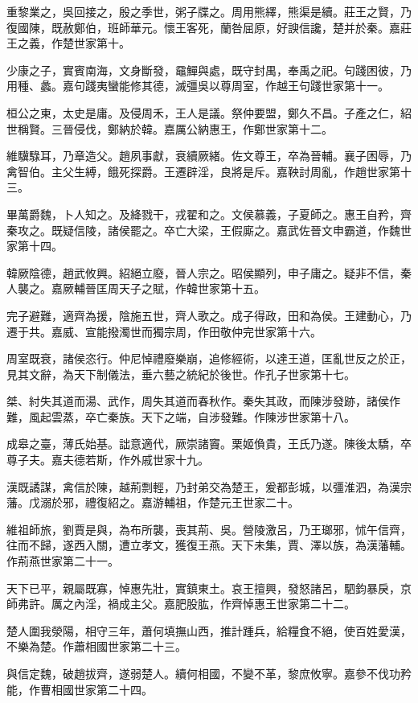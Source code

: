 重黎業之，吳回接之，殷之季世，粥子牒之。周用熊繹，熊渠是續。莊王之賢，乃復國陳，既赦鄭伯，班師華元。懷王客死，蘭咎屈原，好諛信讒，楚并於秦。嘉莊王之義，作楚世家第十。

少康之子，實賓南海，文身斷發，黿鱓與處，既守封禺，奉禹之祀。句踐困彼，乃用種、蠡。嘉句踐夷蠻能修其德，滅彊吳以尊周室，作越王句踐世家第十一。

桓公之東，太史是庸。及侵周禾，王人是議。祭仲要盟，鄭久不昌。子產之仁，紹世稱賢。三晉侵伐，鄭納於韓。嘉厲公納惠王，作鄭世家第十二。

維驥騄耳，乃章造父。趙夙事獻，衰續厥緒。佐文尊王，卒為晉輔。襄子困辱，乃禽智伯。主父生縛，餓死探爵。王遷辟淫，良將是斥。嘉鞅討周亂，作趙世家第十三。

畢萬爵魏，卜人知之。及絳戮干，戎翟和之。文侯慕義，子夏師之。惠王自矜，齊秦攻之。既疑信陵，諸侯罷之。卒亡大梁，王假廝之。嘉武佐晉文申霸道，作魏世家第十四。

韓厥陰德，趙武攸興。紹絕立廢，晉人宗之。昭侯顯列，申子庸之。疑非不信，秦人襲之。嘉厥輔晉匡周天子之賦，作韓世家第十五。

完子避難，適齊為援，陰施五世，齊人歌之。成子得政，田和為侯。王建動心，乃遷于共。嘉威、宣能撥濁世而獨宗周，作田敬仲完世家第十六。

周室既衰，諸侯恣行。仲尼悼禮廢樂崩，追修經術，以達王道，匡亂世反之於正，見其文辭，為天下制儀法，垂六藝之統紀於後世。作孔子世家第十七。

桀、紂失其道而湯、武作，周失其道而春秋作。秦失其政，而陳涉發跡，諸侯作難，風起雲蒸，卒亡秦族。天下之端，自涉發難。作陳涉世家第十八。

成皋之臺，薄氏始基。詘意適代，厥崇諸竇。栗姬偩貴，王氏乃遂。陳後太驕，卒尊子夫。嘉夫德若斯，作外戚世家十九。

漢既譎謀，禽信於陳，越荊剽輕，乃封弟交為楚王，爰都彭城，以彊淮泗，為漢宗藩。戊溺於邪，禮復紹之。嘉游輔祖，作楚元王世家二十。

維祖師旅，劉賈是與，為布所襲，喪其荊、吳。營陵激呂，乃王瑯邪，怵午信齊，往而不歸，遂西入關，遭立孝文，獲復王燕。天下未集，賈、澤以族，為漢藩輔。作荊燕世家第二十一。

天下已平，親屬既寡，悼惠先壯，實鎮東土。哀王擅興，發怒諸呂，駟鈞暴戾，京師弗許。厲之內淫，禍成主父。嘉肥股肱，作齊悼惠王世家第二十二。

楚人圍我滎陽，相守三年，蕭何填撫山西，推計踵兵，給糧食不絕，使百姓愛漢，不樂為楚。作蕭相國世家第二十三。

與信定魏，破趙拔齊，遂弱楚人。續何相國，不變不革，黎庶攸寧。嘉參不伐功矜能，作曹相國世家第二十四。

